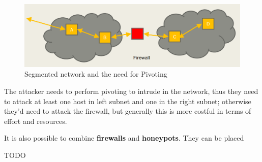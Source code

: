 \begin{figure}[htbp]
   \centering
   \includegraphics{images/pivoting.png}
   \caption{Segmented network and the need for Pivoting}
   \label{fig:pivoting}
\end{figure}

The attacker needs to perform pivoting to intrude in the network, thus they need to attack at least one host in left subnet and one in the right subnet;
otherwise they'd need to attack the firewall, but generally this is more costful in terms of effort and resources.

It is also possible to combine \textbf{firewalls} and \textbf{honeypots}.
They can be placed

TODO
